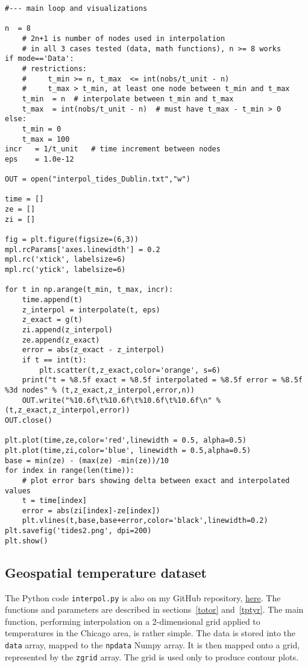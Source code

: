 \documentclass[oneside,10pt]{book}
\begin{document}
\begin{lstlisting}
#--- main loop and visualizations

n  = 8
    # 2n+1 is number of nodes used in interpolation
    # in all 3 cases tested (data, math functions), n >= 8 works
if mode=='Data':
    # restrictions:
    #     t_min >= n, t_max  <= int(nobs/t_unit - n)
    #     t_max > t_min, at least one node between t_min and t_max
    t_min  = n  # interpolate between t_min and t_max
    t_max  = int(nobs/t_unit - n)  # must have t_max - t_min > 0
else:
    t_min = 0
    t_max = 100
incr   = 1/t_unit   # time increment between nodes
eps    = 1.0e-12

OUT = open("interpol_tides_Dublin.txt","w")

time = []
ze = []
zi = []

fig = plt.figure(figsize=(6,3))
mpl.rcParams['axes.linewidth'] = 0.2
mpl.rc('xtick', labelsize=6)
mpl.rc('ytick', labelsize=6)

for t in np.arange(t_min, t_max, incr):
    time.append(t)
    z_interpol = interpolate(t, eps)
    z_exact = g(t)
    zi.append(z_interpol)
    ze.append(z_exact)
    error = abs(z_exact - z_interpol)
    if t == int(t):
        plt.scatter(t,z_exact,color='orange', s=6)
    print("t = %8.5f exact = %8.5f interpolated = %8.5f error = %8.5f %3d nodes" % (t,z_exact,z_interpol,error,n))
    OUT.write("%10.6f\t%10.6f\t%10.6f\t%10.6f\n" % (t,z_exact,z_interpol,error))
OUT.close()

plt.plot(time,ze,color='red',linewidth = 0.5, alpha=0.5)
plt.plot(time,zi,color='blue', linewidth = 0.5,alpha=0.5)
base = min(ze) - (max(ze) -min(ze))/10
for index in range(len(time)):
    # plot error bars showing delta between exact and interpolated values
    t = time[index]
    error = abs(zi[index]-ze[index])
    plt.vlines(t,base,base+error,color='black',linewidth=0.2)
plt.savefig('tides2.png', dpi=200)
plt.show()
\end{lstlisting}

\subsection{Geospatial temperature dataset}\label{pyif}


The Python code \texttt{interpol.py} is also on my GitHub repository, \href{https://github.com/VincentGranville/Statistical-Optimization/blob/main/interpol.py}{here}.
The functions and parameters are described in sections~\ref{totor} and~\ref{tptyr}. The main function, performing interpolation on a 2-dimensional grid applied
to temperatures in the Chicago area, is rather simple.  The data is stored into the \texttt{data} array, mapped to the \texttt{npdata} Numpy array. It is then mapped onto a grid,  represented
 by the \texttt{zgrid} array. The grid is used only to produce contour plots.
\end{document}
